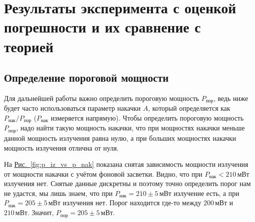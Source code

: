 \documentclass[12pt]{article}
\newcommand*{\figref}[2][]{\hyperref[#2]{Рис.~\ref*{#2}#1}}
\begin{document}
	\section{Результаты эксперимента с оценкой погрешности и их сравнение с теорией}

	\subsection{Определение пороговой мощности}

	Для дальнейшей работы важно определить пороговую мощность $P_\text{пор}$, ведь ниже будет часто использоваться параметр накачки $A$, который определяется как $P_\text{нак} / P_\text{пор}$ ($P_\text{нак}$ измеряется напрямую). Чтобы определить пороговую мощность $P_\text{пор}$, надо найти такую мощность накачки, что при мощностях накачки меньше данной мощность излучения равна нулю, а при больших мощностях накачки мощность излучения отлична от нуля.

	На \figref{fig:p_iz_vs_p_nak} показана снятая зависимость мощности излучения от мощности накачки с учётом фоновой засветки. Видно, что при $P_\text{нак}<210\,\text{мВт}$ излучения нет. Снятые данные дискретны и поэтому точно определить порог нам не удастся, мы лишь знаем, что при $P_\text{нак}=210\pm5\,\text{мВт}$ излучение есть, а при $P_\text{нак}=205\pm5\,\text{мВт}$ излучения нет. Порог находится где-то между $200\,\text{мВт}$ и $210\,\text{мВт}$. Значит, $P_\text{пор} = 205\pm5\,\text{мВт}.$
\end{document}
